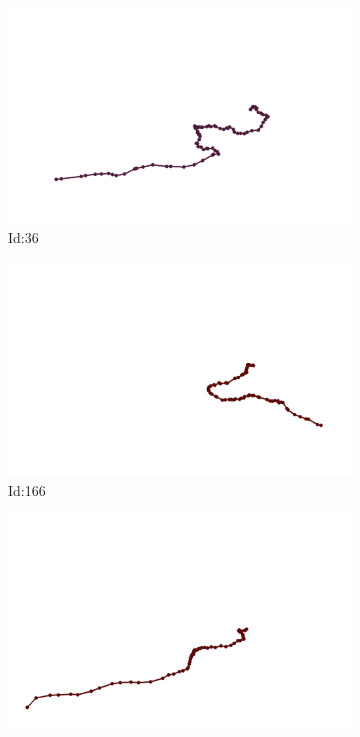 \documentclass[12pt,twoside]{report}
\begin{document}
\begin{figure}
\centering
\begin{subfigure}[b]{0.20\textwidth}
\centering
\includegraphics[width=\textwidth]{../../trajectories/36.png}
\caption{Id:36}
\end{subfigure}
\begin{subfigure}[b]{0.20\textwidth}
\centering
\includegraphics[width=\textwidth]{../../trajectories/166.png}
\caption{Id:166}
\end{subfigure}
\begin{subfigure}[b]{0.20\textwidth}
\centering
\includegraphics[width=\textwidth]{../../trajectories/285.png}

\end{subfigure}
\end{figure}
\end{document}
